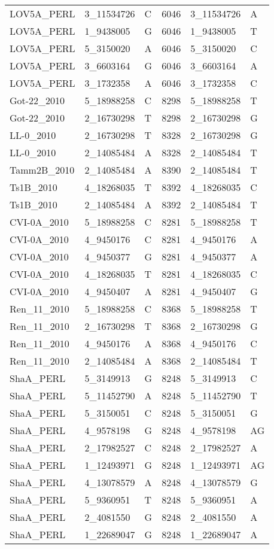 \begin{center}
\begin{longtable}{|l|l|l|l|l|l|}
LOV5A\_PERL&3\_11534726&C&6046&3\_11534726&A\\
LOV5A\_PERL&1\_9438005&G&6046&1\_9438005&T\\
LOV5A\_PERL&5\_3150020&A&6046&5\_3150020&C\\
LOV5A\_PERL&3\_6603164&G&6046&3\_6603164&A\\
LOV5A\_PERL&3\_1732358&A&6046&3\_1732358&C\\
Got-22\_2010&5\_18988258&C&8298&5\_18988258&T\\
Got-22\_2010&2\_16730298&T&8298&2\_16730298&G\\
LL-0\_2010&2\_16730298&T&8328&2\_16730298&G\\
LL-0\_2010&2\_14085484&A&8328&2\_14085484&T\\
Tamm2B\_2010&2\_14085484&A&8390&2\_14085484&T\\
Ts1B\_2010&4\_18268035&T&8392&4\_18268035&C\\
Ts1B\_2010&2\_14085484&A&8392&2\_14085484&T\\
CVI-0A\_2010&5\_18988258&C&8281&5\_18988258&T\\
CVI-0A\_2010&4\_9450176&C&8281&4\_9450176&A\\
CVI-0A\_2010&4\_9450377&G&8281&4\_9450377&A\\
CVI-0A\_2010&4\_18268035&T&8281&4\_18268035&C\\
CVI-0A\_2010&4\_9450407&A&8281&4\_9450407&G\\
Ren\_11\_2010&5\_18988258&C&8368&5\_18988258&T\\
Ren\_11\_2010&2\_16730298&T&8368&2\_16730298&G\\
Ren\_11\_2010&4\_9450176&A&8368&4\_9450176&C\\
Ren\_11\_2010&2\_14085484&A&8368&2\_14085484&T\\
ShaA\_PERL&5\_3149913&G&8248&5\_3149913&C\\
ShaA\_PERL&5\_11452790&A&8248&5\_11452790&T\\
ShaA\_PERL&5\_3150051&C&8248&5\_3150051&G\\
ShaA\_PERL&4\_9578198&G&8248&4\_9578198&AG\\
ShaA\_PERL&2\_17982527&C&8248&2\_17982527&A\\
ShaA\_PERL&1\_12493971&G&8248&1\_12493971&AG\\
ShaA\_PERL&4\_13078579&A&8248&4\_13078579&G\\
ShaA\_PERL&5\_9360951&T&8248&5\_9360951&A\\
ShaA\_PERL&2\_4081550&G&8248&2\_4081550&A\\
ShaA\_PERL&1\_22689047&G&8248&1\_22689047&A\\

\end{longtable}
\end{center}
